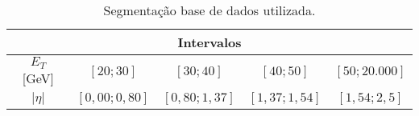 \begin{apendicesenv}
\begin{table}[H]
	\centering
	\begin{footnotesize}
	\caption{Segmentação base de dados utilizada.}
	\label{tab:segmentacaoMC2014}
	\setlength{\extrarowheight}{4pt}       %
	\begin{tabular}{c*{4}c} \toprule
		\multicolumn{5}{c}{\bfseries Intervalos} \\ \midrule
		 $E_T$ [GeV]         &  $[20;30]$ &     $[30;40]$  &   $[40;50]$ &   $[50;20.000]$ \\  \cmidrule(lr){1-1}\cmidrule(lr){2-5}
		$|\eta|$              & $[0,00;0,80]$  & $[0,80;1,37]$ & $[1,37;1,54]$ & $[1,54;2,5]$  \\ \bottomrule
	\end{tabular}
	\end{footnotesize}
\end{table}


\end{apendicesenv}
